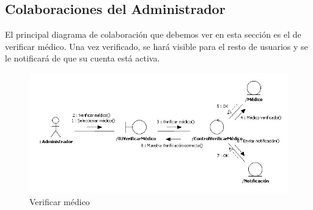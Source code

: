 
	\newpage
	\subsection{Colaboraciones del Administrador} %
	\label{sub:colaboraciones_del_administrador}
	
		El principal diagrama de colaboración que debemos ver en esta sección es el de verificar médico. Una vez verificado, se hará visible para el resto de usuarios y se le notificará de que su cuenta está activa.
		
		\begin{figure}[H]
		  \centering
		    \includegraphics[width=16cm]{img/jpg/colaboraciones/42_VerificarMedico.jpg}
		  \caption{Verificar médico}
		  \label{fig:col_verificar_admin}
		\end{figure}
	
	

